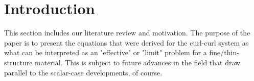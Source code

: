 \section{Introduction} \label{sec:Intro}

This section includes our literature review and motivation.
The purpose of the paper is to present the equations that were derived for the curl-curl system as what can be interpreted as an "effective" or "limit" problem for a fine/thin-structure material.
This is subject to future advances in the field that draw parallel to the scalar-case developments, of course.